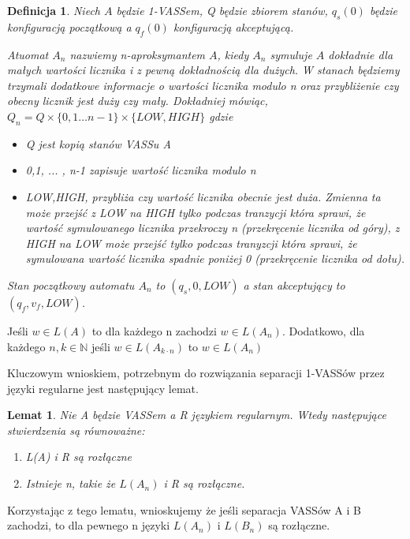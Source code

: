 \documentclass[magisterska]{pracamgr}
\newtheorem{lemma}[theorem]{Lemat}
\newtheorem{definition}[theorem]{Definicja}
\begin{document}
    \begin{definition}
        Niech $A$ będzie 1-VASSem, Q będzie zbiorem stanów, $q_s(0)$ będzie konfiguracją początkową a $q_f(0)$ konfiguracją akceptującą.


        Atuomat $A_n$ nazwiemy n-aproksymantem $A$, kiedy $A_n$ symuluje  $A$ dokładnie dla małych wartości licznika
        i z pewną dokładnością dla dużych.
        W stanach będziemy trzymali dodatkowe informacje o wartości licznika modulo n oraz przybliżenie
        czy obecny licznik jest duży czy mały.
        Dokładniej mówiąc, $Q_n = Q \times \{0,1 \dots n-1\} \times \{LOW,HIGH\}$ gdzie
        \begin{itemize}
            \item Q jest kopią stanów VASSu A
            \item  {0,1, ... , n-1} zapisuje wartość licznika modulo n
            \item   {LOW,HIGH}, przybliża czy wartość licznika obecnie jest duża. Zmienna ta może przejść z LOW na HIGH
            tylko podczas tranzycji która sprawi, że wartość symulowanego licznika przekroczy n  (przekręcenie licznika od góry), z HIGH
            na LOW może przejść tylko podczas tranyzcji która sprawi, że symulowana wartość licznika spadnie poniżej 0 (przekręcenie licznika od dołu).
        \end{itemize}
        Stan początkowy automatu $A_n$ to $(q_s,0,LOW)$ a stan akceptujący to $(q_f,v_f,LOW)$.

    \end{definition}
    Jeśli $w \in L(A)$ to dla każdego n zachodzi $w \in L(A_n)$.
    Dodatkowo, dla każdego $n,k \in \mathbb{N}$ jeśli $w \in L(A_{k \cdot n})$ to $w \in L(A_n)$

    Kluczowym wnioskiem, potrzebnym do rozwiązania separacji 1-VASSów przez języki regularne jest następujący lemat.
    \begin{lemma}
        \label{aproximants}
        Nie A będzie VASSem a R językiem regularnym.
        Wtedy następujące stwierdzenia są równoważne:
        \begin{enumerate}
            \item L(A) i R są rozłączne
            \item Istnieje n, takie że $L(A_n)$ i R są rozłączne.
        \end{enumerate}
    \end{lemma}

    Korzystając z tego lematu, wnioskujemy że jeśli separacja VASSów A i B zachodzi, to dla pewnego n języki
    $L(A_n)$ i $L(B_n)$ są rozłączne.
\end{document}
